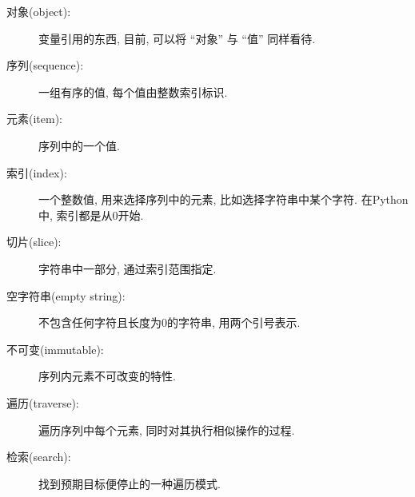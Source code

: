 \documentclass[10pt]{book}
\begin{document}
\begin{description}

\item[对象(object):] 变量引用的东西, 目前, 可以将
``对象'' 与 ``值'' 同样看待. 

\item[序列(sequence):] 一组有序的值, 每个值由整数索引标识. 

\item[元素(item):] 序列中的一个值.

\item[索引(index):] 一个整数值, 用来选择序列中的元素, 
比如选择字符串中某个字符. 在Python中, 索引都是从0开始. 

\item[切片(slice):] 字符串中一部分, 通过索引范围指定. 

\item[空字符串(empty string):] 不包含任何字符且长度为0的字符串, 用两个引号表示. 

\item[不可变(immutable):] 序列内元素不可改变的特性. 

\item[遍历(traverse):] 遍历序列中每个元素, 同时对其执行相似操作的过程. 

\item[检索(search):] 找到预期目标便停止的一种遍历模式. 


\end{description}
\end{document}

